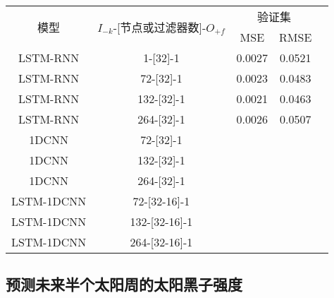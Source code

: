   \begin{table}[!htbp]
    \centering
    \label{tab:ss_area_out_1}
    \footnotesize
    \renewcommand{\arraystretch}{1}
    \begin{tabular}{ccccc}
      \toprule
      \multirow{2}{*}{模型} & \multirow{2}{*}{$I_{-k}$-[节点或过滤器数]-$O_{+f}$} & \multicolumn{2}{c}{验证集}\\
      \cmidrule(lr){3-4}
      \noalign{\smallskip}
      & & MSE & RMSE\\
      \midrule 
      LSTM-RNN & 1-[32]-1 & 0.0027 & 0.0521 \\
      LSTM-RNN & 72-[32]-1 & 0.0023 & 0.0483 \\
      LSTM-RNN & 132-[32]-1 & 0.0021 & 0.0463 \\
      LSTM-RNN & 264-[32]-1 & 0.0026 & 0.0507 \\
      \hline
      1DCNN & 72-[32]-1 & & \\
      1DCNN & 132-[32]-1 & & \\
      1DCNN & 264-[32]-1 & & \\
      \hline
      LSTM-1DCNN & 72-[32-16]-1 & & \\
      LSTM-1DCNN & 132-[32-16]-1 & & \\
      LSTM-1DCNN & 264-[32-16]-1 & & \\
      \bottomrule
    \end{tabular}
  \end{table}

\subsection{预测未来半个太阳周的太阳黑子强度}\label{sec:ss_result_72}

